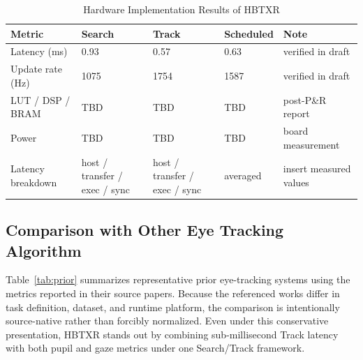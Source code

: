 \documentclass[journal]{IEEEtran}
\begin{document}
\begin{table}[t]
\caption{Hardware Implementation Results of HBTXR}
\label{tab:impl}
\centering
\scriptsize
\begin{tabular}{p{}p{}p{}p{}p{}}
\toprule
Metric & Search & Track & Scheduled & Note \\
\midrule
Latency (ms) & 0.93 & 0.57 & 0.63 & verified in draft \\
Update rate (Hz) & 1075 & 1754 & 1587 & verified in draft \\
LUT / DSP / BRAM & TBD & TBD & TBD & post-P\&R report \\
Power & TBD & TBD & TBD & board measurement \\
Latency breakdown & host / transfer / exec / sync & host / transfer / exec / sync & averaged & insert measured values \\
\bottomrule
\end{tabular}
\end{table}

\subsection{Comparison with Other Eye Tracking Algorithm}
Table~\ref{tab:prior} summarizes representative prior eye-tracking systems using the metrics reported in their source papers. Because the referenced works differ in task definition, dataset, and runtime platform, the comparison is intentionally source-native rather than forcibly normalized. Even under this conservative presentation, HBTXR stands out by combining sub-millisecond Track latency with both pupil and gaze metrics under one Search/Track framework.
\end{document}

